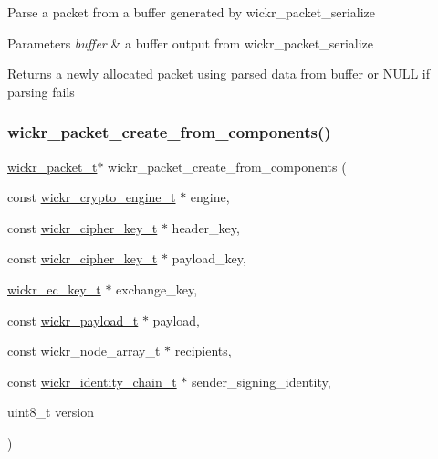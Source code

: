 Parse a packet from a buffer generated by \textquotesingle{}wickr\+\_\+packet\+\_\+serialize\textquotesingle{}


\begin{DoxyParams}{Parameters}
{\em buffer} & a buffer output from \textquotesingle{}wickr\+\_\+packet\+\_\+serialize\textquotesingle{} \\
\hline
\end{DoxyParams}
\begin{DoxyReturn}{Returns}
a newly allocated packet using parsed data from \textquotesingle{}buffer\textquotesingle{} or N\+U\+LL if parsing fails 
\end{DoxyReturn}
\mbox{\label{group__wickr__protocol_gaf34d8082df52a7ade2fea54eea65d342}} 
\subsubsection{\texorpdfstring{wickr\_packet\_create\_from\_components()}{wickr\_packet\_create\_from\_components()}}
{\footnotesize\ttfamily \mbox{\hyperlink{structwickr__packet}{wickr\+\_\+packet\+\_\+t}}$\ast$ wickr\+\_\+packet\+\_\+create\+\_\+from\+\_\+components (\begin{DoxyParamCaption}\item[{const \mbox{\hyperlink{structwickr__crypto__engine}{wickr\+\_\+crypto\+\_\+engine\+\_\+t}} $\ast$}]{engine,  }\item[{const \mbox{\hyperlink{structwickr__cipher__key}{wickr\+\_\+cipher\+\_\+key\+\_\+t}} $\ast$}]{header\+\_\+key,  }\item[{const \mbox{\hyperlink{structwickr__cipher__key}{wickr\+\_\+cipher\+\_\+key\+\_\+t}} $\ast$}]{payload\+\_\+key,  }\item[{\mbox{\hyperlink{structwickr__ec__key}{wickr\+\_\+ec\+\_\+key\+\_\+t}} $\ast$}]{exchange\+\_\+key,  }\item[{const \mbox{\hyperlink{structwickr__payload}{wickr\+\_\+payload\+\_\+t}} $\ast$}]{payload,  }\item[{const wickr\+\_\+node\+\_\+array\+\_\+t $\ast$}]{recipients,  }\item[{const \mbox{\hyperlink{structwickr__identity__chain}{wickr\+\_\+identity\+\_\+chain\+\_\+t}} $\ast$}]{sender\+\_\+signing\+\_\+identity,  }\item[{uint8\+\_\+t}]{version }\end{DoxyParamCaption})}

